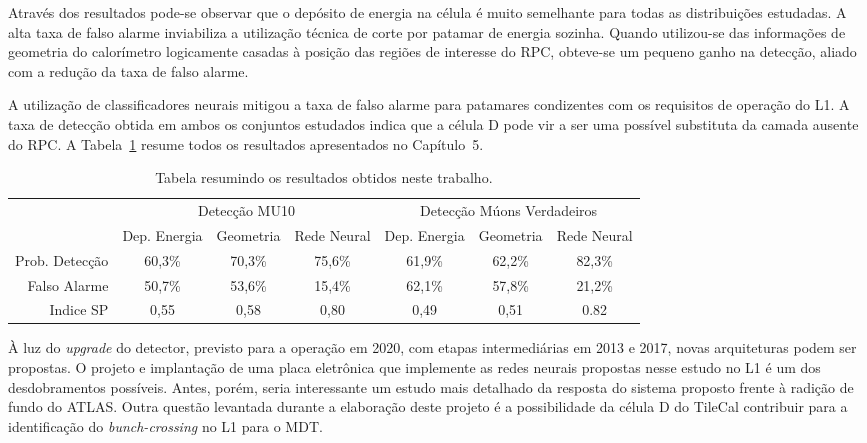 Através dos resultados pode-se observar que o depósito de energia na célula é
muito semelhante para todas as distribuições estudadas. A alta taxa de falso
alarme inviabiliza a utilização técnica de corte por patamar de energia sozinha.
Quando utilizou-se das informações de geometria do calorímetro logicamente
casadas à posição das regiões de interesse do RPC, obteve-se um pequeno ganho na
detecção, aliado com a redução da taxa de falso alarme.

A utilização de classificadores neurais mitigou a taxa de falso alarme para
patamares condizentes com os requisitos de operação do L1. A taxa de detecção
obtida em ambos os conjuntos estudados indica que a célula D pode vir a ser uma
possível substituta da camada ausente do RPC. A Tabela~\ref{summary}
resume todos os resultados apresentados no Capítulo~5. 

\begin{table}[hptp!]\footnotesize
  \centering
  \tabcolsep=0.08cm
  \begin{tabular}{ r c c c c c c }
       \multicolumn{1}{c}{} & \multicolumn{3}{c}{Detecção MU10}& \multicolumn{3}{c}{Detecção Múons Verdadeiros} \\
        \cmidrule(r){2-4}
        \cmidrule(r){5-7}
      & Dep. Energia & Geometria & Rede Neural & Dep. Energia & Geometria & Rede Neural \\
      \midrule
      Prob. Detecção & 60,3\% & 70,3\% & 75,6\% & 61,9\%  & 62,2\% & 82,3\% \\[1.5ex]
      Falso Alarme   & 50,7\% & 53,6\% & 15,4\% & 62,1\%  & 57,8\% & 21,2\% \\[1.5ex]
      Indice SP      & 0,55   & 0,58   & 0,80 & 0,49    & 0,51   & 0.82   \\
      \bottomrule
  \end{tabular}
  \caption{Tabela resumindo os resultados obtidos neste trabalho.}
  \label{summary}
\end{table}



À luz do \emph{upgrade} do detector, previsto para a operação em 2020, com
etapas intermediárias em 2013 e 2017, novas arquiteturas podem ser propostas. O
projeto e implantação de uma placa eletrônica que implemente as redes neurais
propostas nesse estudo no L1 é um dos desdobramentos possíveis. Antes, porém,
seria interessante um estudo mais detalhado da resposta do sistema proposto
frente à radição de fundo do ATLAS.  Outra questão levantada durante a
elaboração deste projeto é a possibilidade da célula D do TileCal contribuir
para a identificação do \emph{bunch-crossing} no L1 para o MDT.

